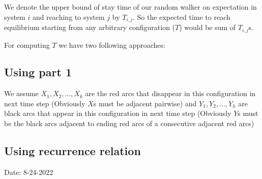 \documentclass[]{book}
\theoremstyle{definition}
\begin{document}
We denote the upper bound of stay time of our random walker on expectation in system $i$ and reaching to system $j$ by $T_{i, j}$. So the expected time to reach equilibrium starting from any arbitrary configuration ($T$) would be sum of $T_{i,j}$s.



For computing $T$ we have two following approaches:
\subsection{Using  part 1}

We assume $X_1, X_2, \hdots, X_k$ are the red arcs that disappear in this configuration in next time step (Obviously $X$s must be adjacent pairwise) and $Y_1, Y_2, \hdots, Y_h$  are black arcs that appear in this configuration in next time step (Obviously $Y$s must be the black arcs adjacent to ending red arcs of a consecutive adjacent red arcs)


\subsection{Using recurrence relation}

\newpage
\begin{center}
Date: 8-24-2022
\end{center}
\end{document}
